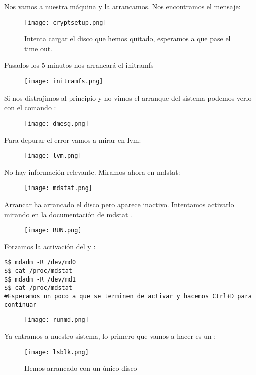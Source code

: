 Nos vamos a nuestra máquina y la arrancamos. Nos encontramos el mensaje:

\begin{figure}[H]
	\centering
	\texttt{[image: cryptsetup.png]}
	\caption{Intenta cargar el disco que hemos quitado, esperamos a que pase el time out.}
\end{figure}

Pasados los 5 minutos nos arrancará el initramfs
\begin{figure}[H]
	\centering
	\texttt{[image: initramfs.png]}
\end{figure}

Si nos distrajimos al principio y no vimos el arranque del sistema podemos verlo con el comando :

\begin{figure}[H]
	\centering
	\texttt{[image: dmesg.png]}
\end{figure}

Para depurar el error vamos a mirar en lvm:
\begin{figure}[H]
	\centering
	\texttt{[image: lvm.png]}
\end{figure}
No hay información relevante. Miramos ahora en mdstat: 
\begin{figure}[H]
	\centering
	\texttt{[image: mdstat.png]}
\end{figure}

Arrancar ha arrancado el disco pero aparece inactivo. Intentamos activarlo mirando en la documentación de mdstat \cite{mdstat}.

\begin{figure}[H]
	\centering
	\texttt{[image: RUN.png]}
\end{figure}

Forzamos la activación del  y :

\begin{verbatim}
$$ mdadm -R /dev/md0
$$ cat /proc/mdstat
$$ mdadm -R /dev/md1
$$ cat /proc/mdstat
#Esperamos un poco a que se terminen de activar y hacemos Ctrl+D para continuar
\end{verbatim}
\begin{figure}[H]
	\centering
	\texttt{[image: runmd.png]}
\end{figure}
Ya entramos a nuestro sistema, lo primero que vamos a hacer es un :
\begin{figure}[H]
	\centering
	\texttt{[image: lsblk.png]}
	\caption{Hemos arrancado con un único disco}
\end{figure}

